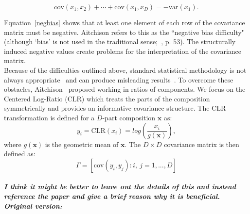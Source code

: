 \documentclass{article}\usepackage[]{graphicx}\usepackage[]{color}
\theoremstyle{definition}
\begin{document}
\begin{equation}
\text{cov}(x_1, x_2) + \cdots + \text{cov}(x_1, x_D) = -\text{var}(x_1).
\label{negbias}
\end{equation}

Equation~\ref{negbias} shows that at least one element of each row of the covariance matrix must be negative. Aitchison refers to this as the ``negative bias difficulty" (although `bias' is not used in the traditional sense;~\cite{Aitchison1986}, p. 53). The structurally induced negative values create problems for the interpretation of the covariance matrix.\\


Because of the difficulties outlined above, standard statistical methodology is not always appropriate~\cite{Aitchison1986} and can produce misleading results~\cite{Lovell2015}.  To overcome these obstacles, Aitchison~\cite{Aitchison1980} proposed working in ratios of components. We focus on the Centered Log-Ratio (CLR) which treats the parts of the composition symmetrically and provides an informative covariance structure.  The CLR transformation is defined for a $D$-part composition $\mathbf{x}$ as:
\begin{equation}
y_i  = \text{CLR}(x_i) = log \left(\frac{x_i}{g(\mathbf{x})} \right),
\label{clr}
\end{equation}
where $g(\mathbf{x})$ is the geometric mean of $\mathbf{x}$.  The $D \times D$ covariance matrix is then defined as:
\begin{equation}
\Gamma = \left[\text{cov}\left(y_i, y_j \right): i,\ j = 1, ..., D \right]
\label{gamma}
\end{equation}
\\

\emph{\textbf{I think it might be better to leave out the details of this and instead reference the paper and give a brief reason why it is beneficial.
Original version:}}
\end{document}
